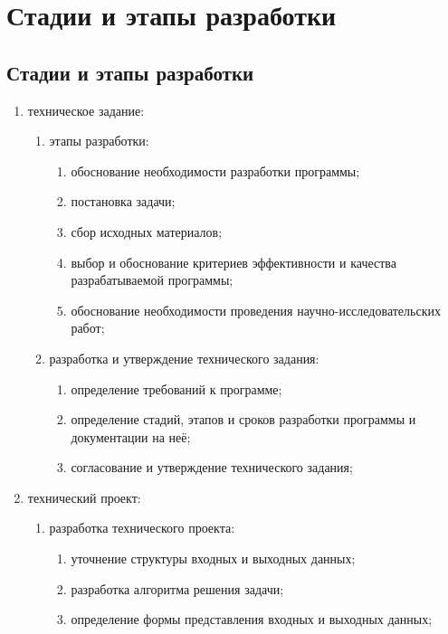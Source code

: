 \section{Стадии и этапы разработки}

\subsection{Стадии и этапы разработки}

\begin{enumerate}
    \item техническое задание:
    \begin{enumerate}
        \item этапы разработки:
        \begin{enumerate}
            \item обоснование необходимости разработки программы;
            \item постановка задачи;
            \item сбор исходных материалов;
            \item выбор и обоснование критериев эффективности и качества разрабатываемой программы;
            \item обоснование необходимости проведения научно-исследовательских работ;
        \end{enumerate}
        \item разработка и утверждение технического задания:
        \begin{enumerate}
            \item определение требований к программе;
            \item определение стадий, этапов и сроков разработки программы и документации на неё;
            \item согласование и утверждение технического задания;
        \end{enumerate}
    \end{enumerate}
    \item технический проект:
    \begin{enumerate}
        \item разработка технического проекта:
        \begin{enumerate}
            \item уточнение структуры входных и выходных данных;
            \item разработка алгоритма решения задачи;
            \item определение формы представления входных и выходных данных;

\end{enumerate}
\end{enumerate}
\end{enumerate}
